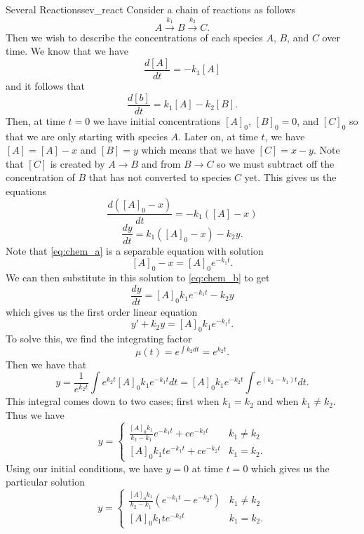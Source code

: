         
        \begin{ex}{Several Reactions}{sev_react}
        Consider a chain of reactions as follows
        \[
        A\xrightarrow{k_1} B \xrightarrow{k_2} C.
        \]
        Then we wish to describe the concentrations of each species $A$, $B$, and $C$ over time. We know that we have
        \[
        \frac{d[A]}{dt}=-k_1[A]
        \]
        and it follows that
        \[
        \frac{d[b]}{dt}=k_1[A]-k_2[B].
        \]
        Then, at time $t=0$ we have initial concentrations $[A]_0$, $[B]_0=0$, and $[C]_0$ so that we are only starting with species $A$. Later on, at time $t$, we have $[A]=[A]-x$ and $[B]=y$ which means that we have $[C]=x-y$.  Note that $[C]$ is created by $A\to B$ and from $B\to C$ so we must subtract off the concentration of $B$ that has not converted to species $C$ yet. This gives us the equations
        \begin{equation}
                        \frac{d([A]_0-x)}{dt}=-k_1([A]-x) \label{eq:chem_a}
        \end{equation}
        \begin{equation}
                        \frac{dy}{dt}=k_1([A]_0-x)-k_2y. \label{eq:chem_b}
        \end{equation}
        Note that \ref{eq:chem_a} is a separable equation with solution
        \[
        [A]_0-x=[A]_0e^{-k_1t}.
        \]
        We can then substitute in this solution to \ref{eq:chem_b} to get
        \[
        \frac{dy}{dt}=[A]_0k_1e^{-k_1t}-k_2y
        \]
        which gives us the first order linear equation
        \[
        y'+k_2y=[A]_0k_1e^{-k_1t}.
        \]
        To solve this, we find the integrating factor
        \[
        \mu(t)=e^{\int k_2 dt}=e^{k_2t}.
        \]
        Then we have that
        \[
        y=\frac{1}{e^{k_2t}}\int e^{k_2t}[A]_0k_1e^{-k_1t}dt=[A]_0k_1e^{-k_2t}\int e^{(k_2-k_1)t}dt.
        \]
        This integral comes down to two cases; first when $k_1=k_2$ and when $k_1\neq k_2$. Thus we have
        \[
        y=\begin{cases}
        \frac{[A]_0k_1}{k_2-k_1}e^{-k_1t}+ce^{-k_2t} & k_1\neq k_2\\
        [A]_0k_1te^{-k_1t}+ce^{-k_2t} & k_1=k_2.
        \end{cases}
        \]
        Using our initial conditions, we have $y=0$ at time $t=0$ which gives us the particular solution
        \[
        y=\begin{cases}
        \frac{[A]_0k_1}{k_2-k_1}\left( e^{-k_1t}-e^{-k_2t}\right) & k_1\neq k_2\\
        [A]_0k_1te^{-k_2t} & k_1=k_2.
        \end{cases}
        \]
        

\end{ex}
